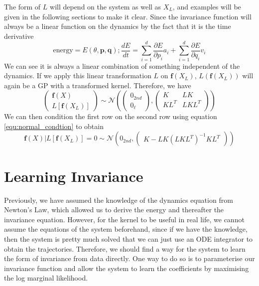 \documentclass{statsmsc}
\begin{document}
The form of $L$ will depend on the system as well as $X_L$, and examples will be given in the following sections to make it clear.
Since the invariance function will always be a linear function on the dynamics by the fact that it is the time derivative
$$
\text{energy}=E(\theta, \mathbf{p}, \mathbf{q});  \frac{dE}{dt}= \sum_{i=1}^d \frac{\partial E}{\partial p_i} a_i + \sum_{i=1}^d\frac{\partial E}{\partial q_i} v_i
$$
We can see it is always a linear combination of something independent of the dynamics.
If we apply this linear transformation $L$ on $\mathbf{f}(X_L)$, $L(\mathbf{f}(X_L))$ will again be a GP with a transformed kernel.
Therefore, we have 
$$\begin{pmatrix}
\mathbf{f}(X)\\L[\mathbf{f}(X_L)]
\end{pmatrix}
\sim\mathcal{N}
\left(\begin{pmatrix}0_{2nd}\\0_{\ell}\end{pmatrix}, \begin{pmatrix}
    K & LK \\
    KL^T & LKL^T\\
\end{pmatrix}\right)
$$
We can then condition the first row on the second row using equation \ref{equ:normal_condtion} to obtain
\begin{equation}
  \mathbf{f}(X)|L[\mathbf{f}(X_L)]=0 \sim \mathcal{N} \left(0_{2nd}, \begin{pmatrix}
    K-LK(LKL^T)^{-1}KL^T
  \end{pmatrix}\right)
  \label{equ:invariance_condition}
\end{equation}


\section{Learning Invariance}
Previously, we have assumed the knowledge of the dynamics equation from Newton's Law, which allowed us to derive the energy and thereafter the invariance equation. 
However, for the kernel to be useful in real life, we cannot assume the equations of the system beforehand, since if we have the knowledge, then the system is pretty much solved that we can just use an ODE integrator to obtain the trajectories. 
Therefore, we should find a way for the system to learn the form of invariance from data directly.
One way to do so is to parameterise our invariance function and allow the system to learn the coefficients by maximising the log marginal likelihood.
\end{document}
